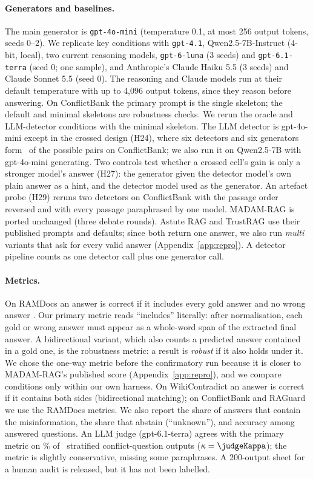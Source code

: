 \paragraph{Generators and baselines.}
The main generator is \texttt{gpt-4o-mini} \citep{openai2024gpt4o} (temperature 0.1, at most 256 output tokens, seeds
0--2). We replicate key conditions with \texttt{gpt-4.1}, Qwen2.5-7B-Instruct \citep{yang2024qwen25} (4-bit, local),
two current reasoning models, \texttt{gpt-6-luna} (3 seeds) and \texttt{gpt-6.1-terra} (seed 0; one sample), and Anthropic's
Claude Haiku 5.5 (3 seeds) and Claude Sonnet 5.5 (seed 0). The reasoning and Claude models run at their default
temperature with up to 4,096 output tokens, since they reason before answering. On ConflictBank the primary prompt is
the single skeleton; the default and minimal skeletons are robustness checks. We rerun the oracle and LLM-detector
conditions with the minimal skeleton.
The LLM detector is gpt-4o-mini except in the crossed design (H24), where six detectors and six generators form
\hTwentyFourCells\ of the possible pairs on ConflictBank; we also run it on Qwen2.5-7B with gpt-4o-mini generating. Two controls test
whether a crossed cell's gain is only a stronger model's answer (H27): the generator given the detector model's own
plain answer as a hint, and the detector model used as the generator. An artefact probe (H29) reruns two detectors on
ConflictBank with the passage order reversed and with every passage paraphrased by one model.
MADAM-RAG \citep{wang2025madam} is ported unchanged (three debate rounds). Astute RAG \citep{wang2025astute} and
TrustRAG \citep{zhou2025trustrag} use their published prompts and defaults; since both return one answer, we also run
\emph{multi} variants that ask for every valid answer (Appendix~\ref{app:repro}). A detector pipeline counts as one
detector call plus one generator call.

\paragraph{Metrics.}
On RAMDocs an answer is correct if it includes every gold answer and no wrong answer \citep{wang2025madam}. Our primary
metric reads ``includes'' literally: after normalisation, each gold or wrong answer must appear as a whole-word span
of the extracted final answer. A bidirectional variant, which also counts a predicted answer contained in a gold one,
is the robustness metric: a result is \emph{robust} if it also holds under it. We chose the one-way metric before the confirmatory run because it is closer to MADAM-RAG's
published score (Appendix~\ref{app:repro}), and we compare conditions only within our own harness. On WikiContradict
an answer is correct if it contains both sides (bidirectional matching); on ConflictBank and RAGuard we use the RAMDocs metrics. We also report
the share of answers that contain the misinformation, the share that abstain (``unknown''), and accuracy among answered
questions. An LLM judge (gpt-6.1-terra) agrees with the primary metric on \judgeAgree\% of \judgeN\ stratified
conflict-question outputs ($\kappa=\judgeKappa$); the metric is slightly conservative, missing some paraphrases. A
200-output sheet for a human audit is released, but it has not been labelled.

